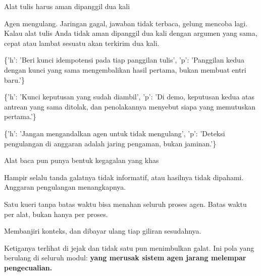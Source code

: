 \documentclass[aspectratio=169,11pt,t]{beamer}
\begin{document}
\begin{frame}[shrink=25]{Alat tulis harus aman dipanggil dua kali}
{\fontsize{9.4}{12.6}\selectfont\color{fg2}Agen mengulang. Jaringan gagal, jawaban tidak terbaca, gelung mencoba lagi. Kalau alat tulis Anda tidak aman dipanggil dua kali dengan argumen yang sama, cepat atau lambat sesuatu akan terkirim dua kali.\par}\vskip 4pt
\begin{isteps}
\item \{'h': 'Beri kunci idempotensi pada tiap panggilan tulis', 'p': 'Panggilan kedua dengan kunci yang sama mengembalikan hasil pertama, bukan membuat entri baru.'\}
\item \{'h': 'Kunci keputusan yang sudah diambil', 'p': 'Di demo, keputusan kedua atas antrean yang sama ditolak, dan penolakannya menyebut siapa yang memutuskan pertama.'\}
\item \{'h': 'Jangan mengandalkan agen untuk tidak mengulang', 'p': 'Deteksi pengulangan di anggaran adalah jaring pengaman, bukan jaminan.'\}
\end{isteps}
\end{frame}

\begin{frame}[shrink=25]{Alat baca pun punya bentuk kegagalan yang khas}
\begin{minipage}[t]{0.3253\textwidth}
\begin{icard}
Hampir selalu tanda galatnya tidak informatif, atau hasilnya tidak dipahami. Anggaran pengulangan menangkapnya.
\end{icard}
\end{minipage}%
\hfill
\begin{minipage}[t]{0.3253\textwidth}
\begin{icard}
Satu kueri tanpa batas waktu bisa menahan seluruh proses agen. Batas waktu per alat, bukan hanya per proses.
\end{icard}
\end{minipage}%
\hfill
\begin{minipage}[t]{0.3253\textwidth}
\begin{icard}
Membanjiri konteks, dan dibayar ulang tiap giliran sesudahnya.
\end{icard}
\end{minipage}%
{\fontsize{9.4}{12.6}\selectfont\color{fg2}Ketiganya terlihat di jejak dan tidak satu pun menimbulkan galat. Ini pola yang berulang di seluruh modul: \textbf{yang merusak sistem agen jarang melempar pengecualian.}\par}\vskip 4pt
\end{frame}
\end{document}
